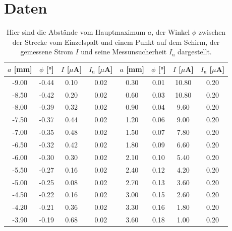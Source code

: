 \documentclass[titlepage = firstcover]{scrartcl}
\begin{document}
    \newpage
    \section{Daten}
        \begin{table}[h]
            \centering
            \caption{Hier sind die Abstände vom Hauptmaximum $a$, der Winkel $\phi$ zwischen der Strecke vom Einzelspalt und einem Punkt auf dem Schirm, der gemessene Strom $I$ und seine Messunsucherheit $I_{\text{u}}$ dargestellt.}
            \label{tab:Messwerte}
            \begin{tabular}{c c c c | c c c c}
                \toprule
                {$a$ [mm]} & {$\phi$ [°]} & {$I$ [$\mu$A]} & {$I_{\text{u}}$ [$\mu$A]} & {$a$ [mm]} & {$\phi$ [°]} & {$I$ [$\mu$A]} & {$I_{\text{u}}$ [$\mu$A]} \\
                \midrule
                -9.00   &  -0.44   &   0.10   &   0.02   &    0.30   &   0.01   &  10.80   &   0.20 \\
                -8.50   &  -0.42   &   0.20   &   0.02   &    0.60   &   0.03   &  10.80   &   0.20 \\
                -8.00   &  -0.39   &   0.32   &   0.02   &    0.90   &   0.04   &   9.60   &   0.20 \\
                -7.50   &  -0.37   &   0.44   &   0.02   &    1.20   &   0.06   &   9.00   &   0.20 \\
                -7.00   &  -0.35   &   0.48   &   0.02   &    1.50   &   0.07   &   7.80   &   0.20 \\
                -6.50   &  -0.32   &   0.42   &   0.02   &    1.80   &   0.09   &   6.60   &   0.20 \\
                -6.00   &  -0.30   &   0.30   &   0.02   &    2.10   &   0.10   &   5.40   &   0.20 \\
                -5.50   &  -0.27   &   0.16   &   0.02   &    2.40   &   0.12   &   4.20   &   0.20 \\
                -5.00   &  -0.25   &   0.08   &   0.02   &    2.70   &   0.13   &   3.60   &   0.20 \\
                -4.50   &  -0.22   &   0.16   &   0.02   &    3.00   &   0.15   &   2.60   &   0.20 \\
                -4.20   &  -0.21   &   0.36   &   0.02   &    3.30   &   0.16   &   1.80   &   0.20 \\
                -3.90   &  -0.19   &   0.68   &   0.02   &    3.60   &   0.18   &   1.00   &   0.20 \\

\end{tabular}
\end{table}
\end{document}
